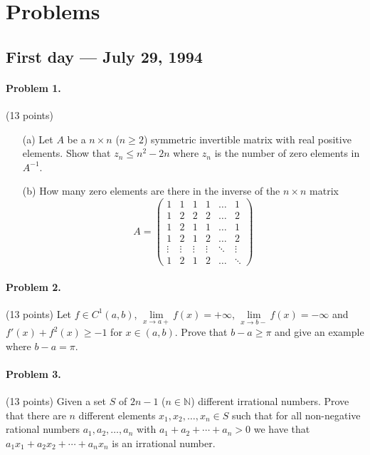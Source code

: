 \documentclass{article}
\begin{document}
\pagestyle{plain}

\section*{Problems}

\subsection*{First day — July 29, 1994}

\paragraph{Problem 1.} (13 points)
\begin{enumerate}
    \item[(a)] Let $A$ be a $n \times n$ ($n \geq 2$) symmetric invertible matrix with real positive elements. Show that $z_n \leq n^2 - 2n$ where $z_n$ is the number of zero elements in $A^{-1}$.
    \item[(b)] How many zero elements are there in the inverse of the $n \times n$ matrix
    \[
    A = \begin{pmatrix}
    1 & 1 & 1 & 1 & \dots & 1 \\
    1 & 2 & 2 & 2 & \dots & 2 \\
    1 & 2 & 1 & 1 & \dots & 1 \\
    1 & 2 & 1 & 2 & \dots & 2 \\
    \vdots & \vdots & \vdots & \vdots & \ddots & \vdots \\
    1 & 2 & 1 & 2 & \dots & \ddots
    \end{pmatrix}
    \]
\end{enumerate}

\paragraph{Problem 2.} (13 points)
Let $f \in C^1(a, b)$, $\lim\limits_{x \to a+} f(x) = +\infty$,
$\lim\limits_{x \to b-} f(x) = -\infty$
and $f'(x) + f^2(x) \geq -1$ for $x \in (a, b)$. Prove that $b - a \geq \pi$ and give an example where $b - a = \pi$.

\paragraph{Problem 3.} (13 points)
Given a set $S$ of $2n - 1$ ($n \in \mathbb{N}$) different irrational numbers. Prove that there are $n$ different elements $x_1, x_2, \ldots, x_n \in S$ such that for all non-negative rational numbers $a_1, a_2, \ldots, a_n$ with $a_1 + a_2 + \cdots + a_n > 0$ we have that $a_1x_1 + a_2x_2 + \cdots + a_nx_n$ is an irrational number.
\end{document}
